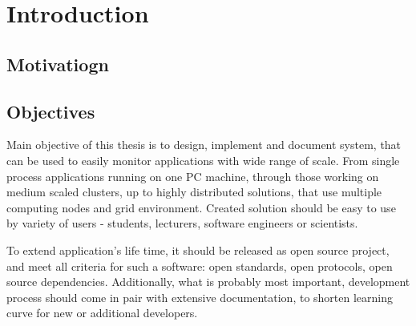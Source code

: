 %


\chapter{Introduction}
\label{cha:intro}


\section{Motivatiogn}
\label{ch1:Motivation}





\section{Objectives}
\label{ch1:Objectives}

Main objective of this thesis is to design, implement and document system, that can be used to easily monitor
applications with wide range of scale. From single process applications running on one PC machine, through those
working on medium scaled clusters, up to highly distributed solutions, that use multiple computing nodes and grid
environment. Created solution should be easy to use by variety of users - students, lecturers, software engineers or
scientists.

To extend application's life time, it should be released as open source project, and meet all criteria for such a
software: open standards, open protocols, open source dependencies. Additionally, what is probably most important,
development process should come in pair with extensive documentation, to shorten learning curve for new or additional
developers.

